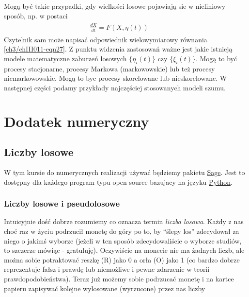 \documentclass[a4paper,12pt,polish]{sphinxmanual}
\makeatletter
\renewenvironment{notice}[2]{\begin{icsebox}\def\py@noticetype{#1}\par\strong{#2}}{\end{icsebox}}\makeatother
\makeatother
\begin{document}
Mogą być takie przypadki, gdy wielkości losowe pojawiają sie w nieliniowy sposób, np. w postaci
\label{ch3/chIII011:equation-eqn27}\begin{gather}
\begin{split} \frac{dX}{dt} = F(X, \eta(t)) \qquad\end{split}\label{ch3/chIII011-eqn27}
\end{gather}
Czytelnik sam może napisać odpowiednik wielowymiarowy równania \eqref{ch3/chIII011-eqn27}. Z punktu widzenia zastosowań ważne jest jakie istnieją modele matematyczne zaburzeń losowych $\{\eta_i(t)\}$ czy $\{\xi_i(t)\}$. Mogą to być procesy stacjonarne, procesy Markowa (markowowskie) lub też procesy niemarkowowskie. Mogą to byc procesy skorelowane lub nieskorelowane. W następnej części podamy przykłady najczęściej stosowanych modeli szumu.


\chapter{Dodatek numeryczny}
\label{index:dodatek-numeryczny}

\section{Liczby losowe}
\label{ch5/chV011:liczby-losowe}\label{ch5/chV011::doc}
\begin{notice}{note}{Uwaga:}
W tym kursie do numerycznych realizacji używać będziemy pakietu \href{http://sagemath.org/}{Sage}. Jest to dostępny dla
każdego program typu open-source bazujacy na języku \href{http://python.org/}{Python}.
\end{notice}


\subsection{Liczby losowe i pseudolosowe}
\label{ch5/chV011:liczby-losowe-i-pseudolosowe}
Intuicyjnie dość dobrze rozumiemy co oznacza termin \emph{liczba losowa}. Każdy z nas choć
raz w życiu podrzucił monetę do góry po to, by ``ślepy los'' zdecydował za niego o jakimś
wyborze (jeżeli w ten sposób zdecydowaliście o wyborze studiów, to szczerze mówiąc -
gratuluję). Oczywiście na monecie nie ma żadnych liczb, ale można sobie potraktować
reszkę (R) jako 0 a orła (O) jako 1 (co bardzo dobrze reprezentuje fałsz i prawdę lub niemożliwe
i pewne zdarzenie w teorii prawdopodobieństwa). Teraz już możemy sobie podrzucać monetę
i na kartce papieru zapisywać kolejne wylosowane (wyrzucone) przez nas liczby
\end{document}
